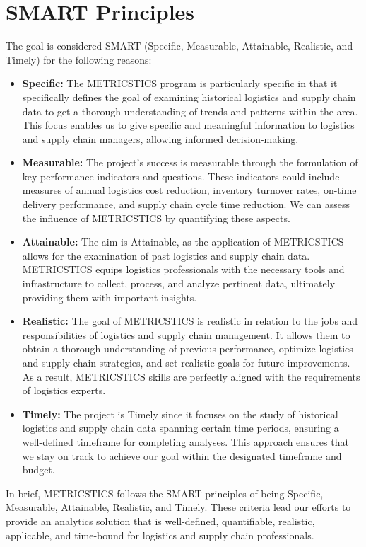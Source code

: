 \documentclass[english,12pt,a4paper]{report}
\begin{document}
	\section{SMART Principles}
	The goal is considered SMART (Specific, Measurable, Attainable, Realistic, and Timely) for the following reasons:
	\begin{itemize}
		\item \textbf{Specific:} The METRICSTICS program is particularly specific in that it specifically defines the goal of examining historical logistics and supply chain data to get a thorough understanding of trends and patterns within the area. This focus enables us to give specific and meaningful information to logistics and supply chain managers, allowing informed decision-making.
				
		\item \textbf{Measurable:} The project's success is measurable through the formulation of key performance indicators and questions. These indicators could include measures of annual logistics cost reduction, inventory turnover rates, on-time delivery performance, and supply chain cycle time reduction. We can assess the influence of METRICSTICS by quantifying these aspects.
		
		\item \textbf{Attainable:} The aim is Attainable, as the application of METRICSTICS allows for the examination of past logistics and supply chain data. METRICSTICS equips logistics professionals with the necessary tools and infrastructure to collect, process, and analyze pertinent data, ultimately providing them with important insights.
		
		\item \textbf{Realistic:} The goal of METRICSTICS is realistic in relation to the jobs and responsibilities of logistics and supply chain management. It allows them to obtain a thorough understanding of previous performance, optimize logistics and supply chain strategies, and set realistic goals for future improvements. As a result, METRICSTICS skills are perfectly aligned with the requirements of logistics experts.
		
		\item \textbf{Timely:} The project is Timely since it focuses on the study of historical logistics and supply chain data spanning certain time periods, ensuring a well-defined timeframe for completing analyses. This approach ensures that we stay on track to achieve our goal within the designated timeframe and budget.
	\end{itemize}
	In brief, METRICSTICS follows the SMART principles of being Specific, Measurable, Attainable, Realistic, and Timely. These criteria lead our efforts to provide an analytics solution that is well-defined, quantifiable, realistic, applicable, and time-bound for logistics and supply chain professionals.
	
\end{document}
